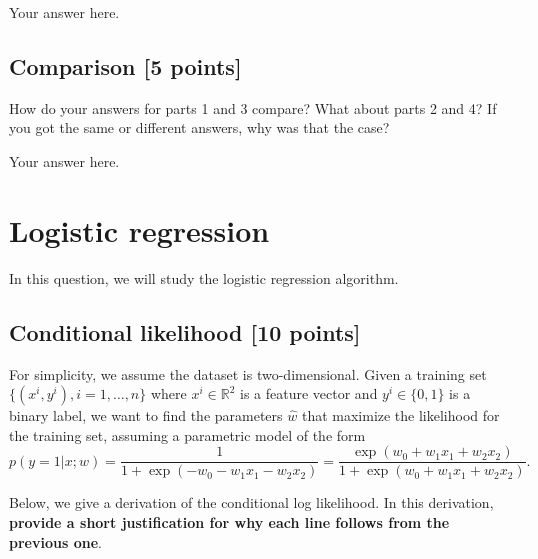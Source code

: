 \documentclass[a4paper]{article}
\theoremstyle{definition}
\begin{document}
	{\color{blue} Your answer here.}
	
	
\subsection{Comparison [5 points]}
	How do your answers for parts 1 and 3 compare? 
	What about parts 2 and 4? 
	If you got the same or different answers, why was that the case?
	
	{\color{blue} Your answer here.}


\newpage
\section{Logistic regression}
In this question, we will study the logistic regression algorithm.

\subsection{Conditional likelihood [10 points]}

For simplicity, we assume the dataset is two-dimensional.
Given a training set $\{(x^i, y^i), i = 1, \ldots, n \}$ where $x^i \in \mathbb{R}^{2}$ is a feature vector and $y^i \in \{0, 1\}$ is a binary label, we want to find the parameters $\hat{w}$ that maximize the likelihood for the training set, assuming a parametric model of the form
\begin{equation}
	p(y = 1 | x; w) = \frac{1}{1 + \exp(-w_0 - w_1 x_1 - w_2 x_2)}
	=\frac{\exp(w_0 + w_1 x_1 + w_2 x_2)}{1+\exp(w_0 + w_1 x_1 + w_2 x_2)}. \label{eq:def}
\end{equation}

Below, we give a derivation of the conditional log likelihood.
In this derivation, \textbf{provide a short justification for why each line follows from the previous one}.
	
\end{document}
